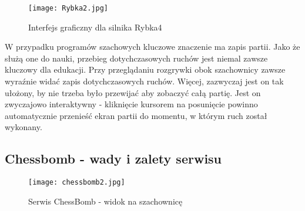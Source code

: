 \documentclass[12pt,leqno]{article}
\begin{document}
\begin{figure}
\texttt{[image: Rybka2.jpg]}
\caption{Interfejs graficzny dla silnika Rybka4}
\end{figure}

\indent W przypadku programów szachowych kluczowe znaczenie ma zapis partii. Jako że służą one do nauki, przebieg dotychczasowych ruchów jest niemal zawsze kluczowy dla edukacji. Przy przeglądaniu rozgrywki obok szachownicy zawsze wyraźnie widać zapis dotychczasowych ruchów. Więcej, zazwyczaj jest on tak ułożony, by nie trzeba było przewijać aby zobaczyć całą partię. Jest on zwyczajowo interaktywny - kliknięcie kursorem na posunięcie powinno automatycznie przenieść ekran partii do momentu, w którym ruch został wykonany.

\subsection{Chessbomb - wady i zalety serwisu}
\begin{figure}
\texttt{[image: chessbomb2.jpg]}
\caption{Serwis ChessBomb - widok na szachownicę}
\end{figure}
\end{document}

